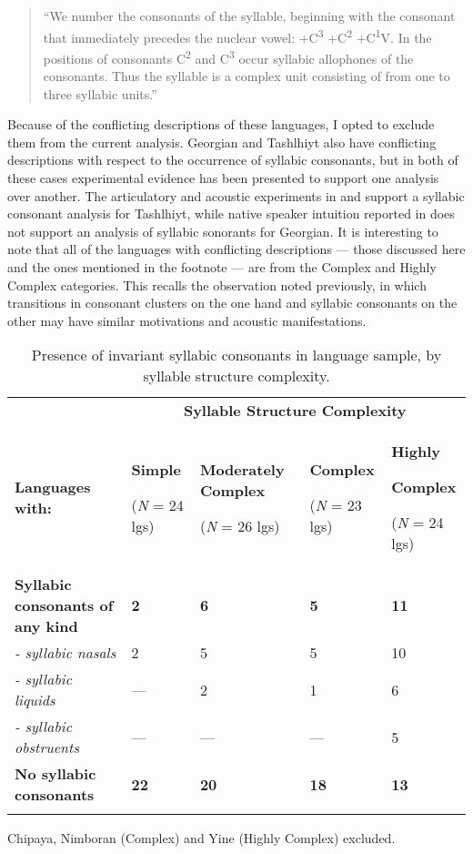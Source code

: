 \begin{quote}
“We number the consonants of the syllable, beginning with the consonant that immediately precedes the nuclear vowel: +C\textsuperscript{3} +C\textsuperscript{2} +C\textsuperscript{1}V. In the positions of consonants C\textsuperscript{2} and C\textsuperscript{3} occur syllabic allophones of the consonants. Thus the syllable is a complex unit consisting of from one to three syllabic units.” 
\citep[23]{Matteson1965}
\end{quote}

Because of the conflicting descriptions of these languages, I opted to exclude them from the current analysis. Georgian and Tashlhiyt also have conflicting descriptions with respect to the occurrence of syllabic consonants, but in both of these cases experimental evidence has been presented to support one analysis over another. The articulatory and acoustic experiments in \citet{Ridouane2008} and \citet{GoldsteinEtAl2007} support a syllabic consonant analysis for Tashlhiyt, while native speaker intuition reported in \citet{Chitoran1999} does not support an analysis of syllabic sonorants for Georgian. It is interesting to note that all of the languages with conflicting descriptions — those discussed here and the ones mentioned in the footnote — are from the Complex and Highly Complex categories. This recalls the observation noted previously, in which transitions in consonant clusters on the one hand and syllabic consonants on the other may have similar motivations and acoustic manifestations.

\begin{table}
\begin{tabularx}{\textwidth}{XXXXX}
 & \multicolumn{4}{c}{ \textbf{Syllable Structure Complexity}}\\
\lsptoprule
 \textbf{Languages with:} & { \textbf{Simple}}

 (\textit{N} = 24 lgs) & { \textbf{Moderately Complex}}

 (\textit{N} = 26 lgs) & { \textbf{Complex}}

 (\textit{N} = 23 lgs) & { \textbf{Highly} }

{ \textbf{Complex}}

 (\textit{N} = 24 lgs)\\
 \textbf{Syllabic consonants of any kind} & \textbf{2} & \textbf{6} & \textbf{5} & \textbf{11}\\
 \textit{- syllabic nasals} & 2 & 5 & 5 & 10\\
 \textit{- syllabic liquids} & — & 2 & 1 & 6\\
 \textit{- syllabic obstruents} & — & — & — & 5\\
 \textbf{No syllabic consonants} & \textbf{22} & \textbf{20} & \textbf{18} & \textbf{13}\\
\lspbottomrule
\end{tabularx}
\caption{\label{tab:3.6}Presence of invariant syllabic consonants in language sample, by syllable structure complexity.}Chipaya, Nimboran (Complex) and Yine (Highly Complex) excluded.
\end{table}

